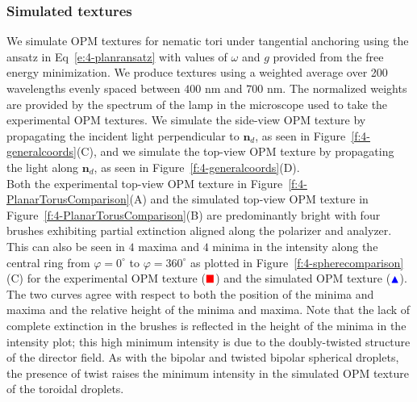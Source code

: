 \subsubsection{Simulated textures}
We simulate OPM textures for nematic tori under tangential anchoring using the ansatz in Eq~\ref{e:4-planransatz} with values of $\omega$ and $g$ provided from the free energy minimization.
We produce textures using a weighted average over 200 wavelengths evenly spaced between $400$ nm and $700$ nm.
The normalized weights are provided by the spectrum of the lamp in the microscope used to take the experimental OPM textures.
We simulate the side-view OPM texture by propagating the incident light perpendicular to $\mathbf{n}_d$, as seen in Figure~\ref{f:4-generalcoords}(C), and we simulate the top-view OPM texture by propagating the light along $\mathbf{n}_d$, as seen in Figure~\ref{f:4-generalcoords}(D).\\

Both the experimental top-view OPM texture in Figure~\ref{f:4-PlanarTorusComparison}(A) and the simulated top-view OPM texture in Figure~\ref{f:4-PlanarTorusComparison}(B) are predominantly bright with four brushes exhibiting partial extinction aligned along the polarizer and analyzer.
This can also be seen in $4$ maxima and $4$ minima in the intensity along the central ring from $\varphi=0^{\circ}$ to $\varphi=360^{\circ}$ as plotted in Figure~\ref{f:4-spherecomparison}(C) for the experimental OPM texture ($\color{red}\blacksquare$) and the simulated OPM texture ($\color{blue}\blacktriangle$).
The two curves agree with respect to both the position of the minima and maxima and the relative height of the minima and maxima.
Note that the lack of complete extinction in the brushes is reflected in the height of the minima in the intensity plot; this high minimum intensity is due to the doubly-twisted structure of the director field.
As with the bipolar and twisted bipolar spherical droplets, the presence of twist raises the minimum intensity in the simulated OPM texture of the toroidal droplets.

